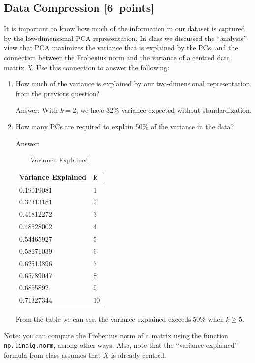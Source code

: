\documentclass{article}
\newcommand{\blu}[1]{{\textcolor{blu}{#1}}}
\newenvironment{answer}{\par\begingroup\color{gre}Answer: }{\endgroup}
\let\ask\blu
\newcommand\pts[1]{\textcolor{pointscolour}{[#1~points]}}
\begin{document}
\subsection{Data Compression \pts{6}}

It is important to know how much of the information in our dataset is captured by the low-dimensional PCA representation.
In class we discussed the ``analysis'' view that PCA maximizes the variance that is explained by the PCs, and the connection between the Frobenius norm and the variance of a centred data matrix $X$.
Use this connection to answer the following:
\begin{enumerate}
	\item \ask{How much of the variance is explained by our two-dimensional representation from the previous question?}
	\begin{answer}
		With $k = 2$, we have 32\% variance expected without standardization.
	\end{answer}
	\item \ask{How many PCs are required to explain 50\% of the variance in the data?}
	\begin{answer}
	\begin{table}[htbp!]
		\centering
		\begin{tabular}{ll}
			\hline
			Variance Explained & k \\
			\hline
			0.19019081  & 1 \\
			0.32313181  & 2 \\ 
			0.41812272  & 3 \\
			0.48628002  & 4 \\
			0.54465927  & 5 \\
			0.58671039  & 6 \\
			0.62513896  & 7 \\
			0.65789047  & 8 \\
			0.6865892   & 9 \\
			0.71327344  & 10 \\
			\hline
		\end{tabular}
		\caption{Variance Explained}
	\end{table}
	From the table we can see, the variance explained exceeds 50\% when $k \geq 5$.
	\end{answer}
\end{enumerate}
Note: you can compute the Frobenius norm of a matrix using the function \texttt{np.linalg.norm}, among other ways. Also, note that the ``variance explained'' formula from class assumes that $X$ is already centred.
\end{document}
